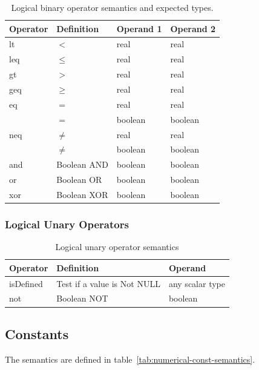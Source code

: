\begin{table}[ht!]
\begin{center}
\small
\begin{tabular}{llll}\toprule
Operator & Definition & Operand 1 & Operand 2 \\\midrule
lt & $<$ & real & real\\
leq & $\leq$ & real & real\\
gt & $>$ & real & real\\
geq & $\geq$ & real & real\\
eq & $=$ & real & real\\
& $=$ & boolean & boolean\\
neq & $\neq$ & real & real\\
 & $\neq$ & boolean & boolean\\
and & Boolean AND & boolean & boolean\\
or & Boolean OR & boolean & boolean\\
xor & Boolean XOR & boolean & boolean\\\bottomrule
\end{tabular}
\end{center}
\caption{Logical binary operator semantics and expected types.}
\label{tab:logic-bin-op-semantics}
\end{table}%


\subsubsection{Logical Unary Operators}

\begin{table}[ht!]
\begin{center}
\small
\begin{tabular}{lll}\toprule
Operator & Definition & Operand \\\midrule
isDefined & Test if a value is Not NULL & any scalar type\\
not & Boolean NOT & boolean \\\bottomrule
\end{tabular}
\end{center}
\caption{Logical unary operator semantics}
\label{tab:logic-unary-op-semantics}
\end{table}%


\subsection{Constants}

\begin{valrules}
   The semantics
  are defined in table~\ref{tab:numerical-const-semantics}.
\end{valrules}

